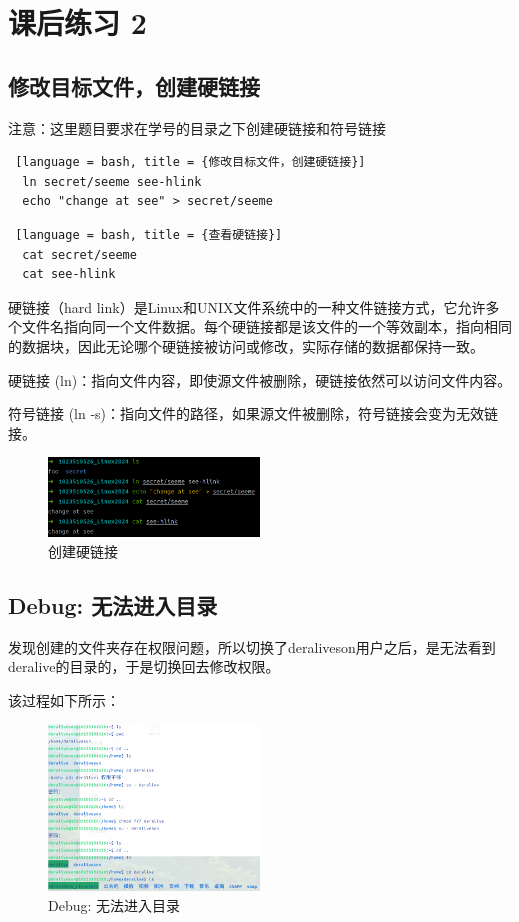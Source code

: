 \documentclass[14pt,a4paper,UTF8,twoside]{article}
\begin{document}
\section{课后练习 2}
\subsection{修改目标文件，创建硬链接}

注意：这里题目要求在学号的目录之下创建硬链接和符号链接

\begin{lstlisting} [language = bash, title = {修改目标文件，创建硬链接}]
  ln secret/seeme see-hlink
  echo "change at see" > secret/seeme
\end{lstlisting}

\begin{lstlisting} [language = bash, title = {查看硬链接}]
  cat secret/seeme
  cat see-hlink
\end{lstlisting}

硬链接（hard link）是Linux和UNIX文件系统中的一种文件链接方式，它允许多个文件名指向同一个文件数据。每个硬链接都是该文件的一个等效副本，指向相同的数据块，因此无论哪个硬链接被访问或修改，实际存储的数据都保持一致。

硬链接 (ln)：指向文件内容，即使源文件被删除，硬链接依然可以访问文件内容。

符号链接 (ln -s)：指向文件的路径，如果源文件被删除，符号链接会变为无效链接。

\begin{figure} [H]
  \centering
  \includegraphics[width=0.5\textwidth]{lec2/hlink.png}
  \caption{创建硬链接}
  \label{fig:6}
\end{figure}

\subsection{Debug: 无法进入目录}

发现创建的文件夹存在权限问题，所以切换了deraliveson用户之后，是无法看到deralive的目录的，于是切换回去修改权限。

该过程如下所示：

\begin{figure}[H]
  \centering
  \includegraphics[width=0.5\textwidth]{lec2/visionable.png}
  \caption{Debug: 无法进入目录}
  \label{fig:7}
\end{figure}
\end{document}
